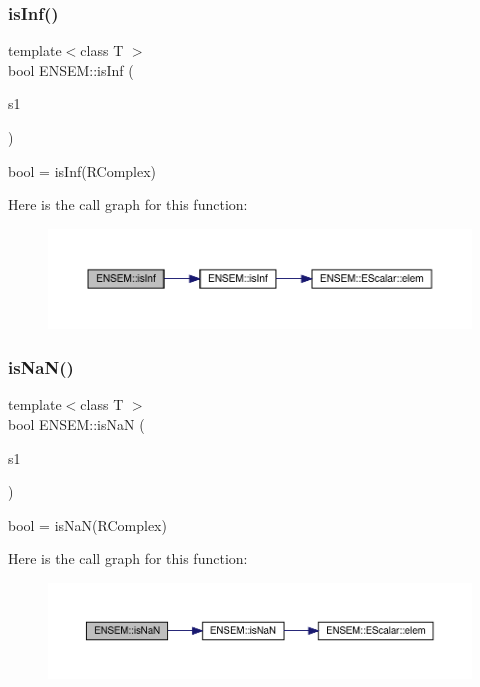 \subsubsection{\texorpdfstring{isInf()}{isInf()}}
{\footnotesize\ttfamily template$<$class T $>$ \\
bool E\+N\+S\+E\+M\+::is\+Inf (\begin{DoxyParamCaption}\item[{const \mbox{\hyperlink{classENSEM_1_1RComplex}{R\+Complex}}$<$ T $>$ \&}]{s1 }\end{DoxyParamCaption})}



bool = is\+Inf(\+R\+Complex) 

Here is the call graph for this function\+:\nopagebreak
\begin{figure}[H]
\begin{center}
\leavevmode
\includegraphics[width=350pt]{da/dc7/group__rcomplex_gabf9e4d305784028c682bdf06201dba86_cgraph}
\end{center}
\end{figure}
\mbox{\label{group__rcomplex_ga909986b087edfa0819ffe4b76d00ed42}} 
\subsubsection{\texorpdfstring{isNaN()}{isNaN()}}
{\footnotesize\ttfamily template$<$class T $>$ \\
bool E\+N\+S\+E\+M\+::is\+NaN (\begin{DoxyParamCaption}\item[{const \mbox{\hyperlink{classENSEM_1_1RComplex}{R\+Complex}}$<$ T $>$ \&}]{s1 }\end{DoxyParamCaption})}



bool = is\+Na\+N(\+R\+Complex) 

Here is the call graph for this function\+:\nopagebreak
\begin{figure}[H]
\begin{center}
\leavevmode
\includegraphics[width=350pt]{da/dc7/group__rcomplex_ga909986b087edfa0819ffe4b76d00ed42_cgraph}
\end{center}
\end{figure}
\mbox{\label{group__rcomplex_ga21235851ad3c6bba4973c55332baaa9e}} 
